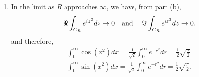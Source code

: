 \documentclass[a4paper,12pt]{article}
\begin{document}
\begin{enumerate}
\begin{enumerate}
            \item
                In the limit as $R$ approaches $\infty$, we have, from part (b),
                \begin{align*}
                    \Re \int_{C_R} e^{iz^2} dz \to 0 \text{\quad and \quad} \Im \int_{C_R} e^{iz^2} dz \to 0,
                \end{align*}
                and therefore,
                \begin{align*}
                    \int_0^\infty \cos(x^2) dx = \frac{1}{\sqrt{2}} \int_0^\infty e^{-r^2} dr = \frac{1}{2} \sqrt{ \frac{\pi}{2} } \\
                    \int_0^\infty \sin(x^2) dx = \frac{1}{\sqrt{2}} \int_0^\infty e^{-r^2} dr = \frac{1}{2} \sqrt{ \frac{\pi}{2} }.
                \end{align*}
        \end{enumerate}
\end{enumerate}
\end{document}
